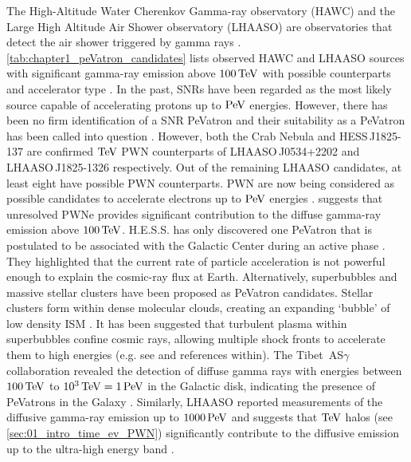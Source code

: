 The High-Altitude Water Cherenkov Gamma-ray observatory (HAWC) and the Large High Altitude Air Shower observatory (LHAASO) are observatories that detect the air shower triggered by gamma rays \citep{LHAASO_website, HAWC}. \autoref{tab:chapter1_peVatron_candidates} lists observed HAWC and LHAASO sources with significant gamma-ray emission above $100\,\TeV$ with possible counterparts and accelerator type \citep{PhysRevLett.124.021102,2021Natur.594...33C}. In the past, SNRs have been regarded as the most likely source capable of accelerating protons up to $\PeV$ energies. However, there has been no firm identification of a SNR PeVatron and their suitability as a PeVatron has been called into question \citep{10.1093/mnras/sty1589,2019IJMPD..2830022G,2021Univ....7..324C,2022MNRAS.516..492B}. However, both the Crab Nebula and \mbox{HESS\,J1825-137} are confirmed $\TeV$ PWN counterparts of \mbox{LHAASO\,J0534+2202} and \mbox{LHAASO\,J1825-1326} respectively. Out of the remaining LHAASO candidates, at least eight have possible PWN counterparts. PWN are now being considered as possible candidates to accelerate electrons up to $\PeV$ energies \citep{2021ApJ...908L..49B,de_O_a_Wilhelmi_2022}. \cite{2022ApJ...928...19V} suggests that unresolved PWNe provides significant contribution to the diffuse gamma-ray emission above $100\,\TeV$.
\newpar
H.E.S.S. has only discovered one PeVatron that is postulated to be associated with the Galactic Center during an active phase \cite{2016Natur.531..476H}. They highlighted that the current rate of particle acceleration is not powerful enough to explain the cosmic-ray flux at Earth.  Alternatively, superbubbles and massive stellar clusters have been proposed as PeVatron candidates. Stellar clusters form within dense molecular clouds, creating an expanding `bubble' of low density ISM \citep{1998LNP...506..399I}. It has been suggested that turbulent plasma within superbubbles confine cosmic rays, allowing multiple shock fronts to accelerate them to high energies (e.g. see \cite{2022MNRAS.515.2256V} and references within).
\newpar 
The \mbox{Tibet AS$\gamma$} collaboration revealed the detection of diffuse gamma rays with energies between $100\,\TeV$ to $10^3\,\TeV=1\,\PeV$ in the Galactic disk, indicating the presence of PeVatrons in the Galaxy \citep{PhysRevLett.126.141101}. Similarly, LHAASO reported measurements of the diffusive gamma-ray emission up to $1000\,\PeV$ and suggests that $\TeV$ halos (see \autoref{sec:01_intro_time_ev_PWN}) significantly contribute to the diffusive emission up to the ultra-high energy band \citep{2023arXiv230505372C}.

